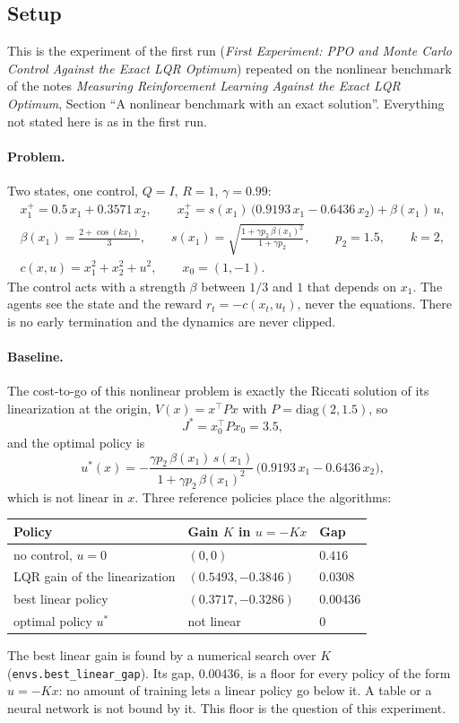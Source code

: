 \documentclass[11pt]{article}
\begin{document}
\subsection{Setup}
\label{sec:setup}

This is the experiment of the first run (\emph{First Experiment: PPO and Monte Carlo Control
Against the Exact LQR Optimum}) repeated on the nonlinear benchmark of the notes \emph{Measuring
Reinforcement Learning Against the Exact LQR Optimum}, Section ``A nonlinear benchmark with an
exact solution''. Everything not stated here is as in the first run.

\paragraph{Problem.} Two states, one control, $Q = I$, $R = 1$, $\gamma = 0.99$:
\begin{gather*}
  x_1^+ = 0.5\, x_1 + 0.3571\, x_2, \qquad
  x_2^+ = s(x_1)\, \big(0.9193\, x_1 - 0.6436\, x_2\big) + \beta(x_1)\, u, \\
  \beta(x_1) = \frac{2 + \cos(k x_1)}{3}, \qquad
  s(x_1) = \sqrt{\frac{1 + \gamma p_2\, \beta(x_1)^2}{1 + \gamma p_2}}, \qquad p_2 = 1.5, \qquad k = 2, \\
  c(x, u) = x_1^2 + x_2^2 + u^2, \qquad x_0 = (1, -1) .
\end{gather*}
The control acts with a strength $\beta$ between $1/3$ and $1$ that depends on $x_1$. The agents
see the state and the reward $r_t = -c(x_t, u_t)$, never the equations. There is no early
termination and the dynamics are never clipped.

\paragraph{Baseline.} The cost-to-go of this nonlinear problem is exactly the Riccati solution of
its linearization at the origin, $V(x) = x^\top P x$ with $P = \mathrm{diag}(2, 1.5)$, so
\[
  J^* = x_0^\top P x_0 = 3.5 ,
\]
and the optimal policy is
\[
  u^*(x) = -\frac{\gamma p_2\, \beta(x_1)\, s(x_1)}{1 + \gamma p_2\, \beta(x_1)^2}\,
  \big(0.9193\, x_1 - 0.6436\, x_2\big),
\]
which is not linear in $x$. Three reference policies place the algorithms:
\begin{center}
  \begin{tabular}{@{}lll@{}}
    \toprule
    Policy & Gain $K$ in $u = -Kx$ & Gap \\
    \midrule
    no control, $u = 0$ & $(0, 0)$ & $0.416$ \\
    LQR gain of the linearization & $(0.5493, -0.3846)$ & $0.0308$ \\
    best linear policy & $(0.3717, -0.3286)$ & $0.00436$ \\
    optimal policy $u^*$ & not linear & $0$ \\
    \bottomrule
  \end{tabular}
\end{center}
The best linear gain is found by a numerical search over $K$ (\texttt{envs.best\_linear\_gap}). Its
gap, $0.00436$, is a floor for every policy of the form $u = -Kx$: no amount of training lets a
linear policy go below it. A table or a neural network is not bound by it. This floor is the
question of this experiment.
\end{document}
